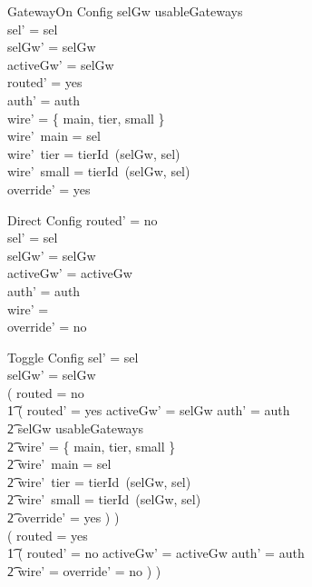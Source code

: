 \documentclass{article}
\begin{document}
\begin{schema}{GatewayOn}
  \Delta Config
\where
  selGw \in usableGateways \\
  sel' = sel \\
  selGw' = selGw \\
  activeGw' = selGw \\
  routed' = yes \\
  auth' = auth \\
  \dom wire' = \{ main, tier, small \} \\
  wire'~main = sel \\
  wire'~tier = tierId~(selGw, sel) \\
  wire'~small = tierId~(selGw, sel) \\
  override' = yes
\end{schema}

\begin{schema}{Direct}
  \Delta Config
\where
  routed' = no \\
  sel' = sel \\
  selGw' = selGw \\
  activeGw' = activeGw \\
  auth' = auth \\
  wire' = \emptyset \\
  override' = no
\end{schema}

\begin{schema}{Toggle}
  \Delta Config
\where
  sel' = sel \\
  selGw' = selGw \\
  ( routed = no \implies \\
  \t1 ( routed' = yes \land activeGw' = selGw \land auth' = auth \land \\
  \t2   selGw \in usableGateways \land \\
  \t2   \dom wire' = \{ main, tier, small \} \land \\
  \t2   wire'~main = sel \land \\
  \t2   wire'~tier = tierId~(selGw, sel) \land \\
  \t2   wire'~small = tierId~(selGw, sel) \land \\
  \t2   override' = yes ) ) \\
  ( routed = yes \implies \\
  \t1 ( routed' = no \land activeGw' = activeGw \land auth' = auth \land \\
  \t2   wire' = \emptyset \land override' = no ) )
\end{schema}
\end{document}
